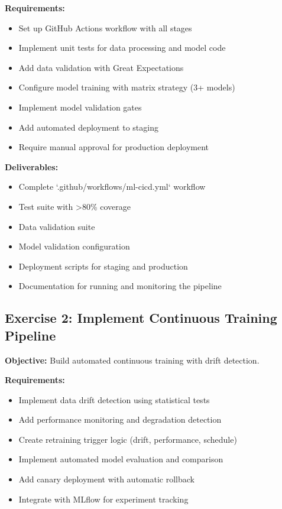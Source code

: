 \textbf{Requirements:}
\begin{itemize}
    \item Set up GitHub Actions workflow with all stages
    \item Implement unit tests for data processing and model code
    \item Add data validation with Great Expectations
    \item Configure model training with matrix strategy (3+ models)
    \item Implement model validation gates
    \item Add automated deployment to staging
    \item Require manual approval for production deployment
\end{itemize}

\textbf{Deliverables:}
\begin{itemize}
    \item Complete `.github/workflows/ml-cicd.yml` workflow
    \item Test suite with >80\% coverage
    \item Data validation suite
    \item Model validation configuration
    \item Deployment scripts for staging and production
    \item Documentation for running and monitoring the pipeline
\end{itemize}

\subsection{Exercise 2: Implement Continuous Training Pipeline}

\textbf{Objective:} Build automated continuous training with drift detection.

\textbf{Requirements:}
\begin{itemize}
    \item Implement data drift detection using statistical tests
    \item Add performance monitoring and degradation detection
    \item Create retraining trigger logic (drift, performance, schedule)
    \item Implement automated model evaluation and comparison
    \item Add canary deployment with automatic rollback
    \item Integrate with MLflow for experiment tracking
\end{itemize}

